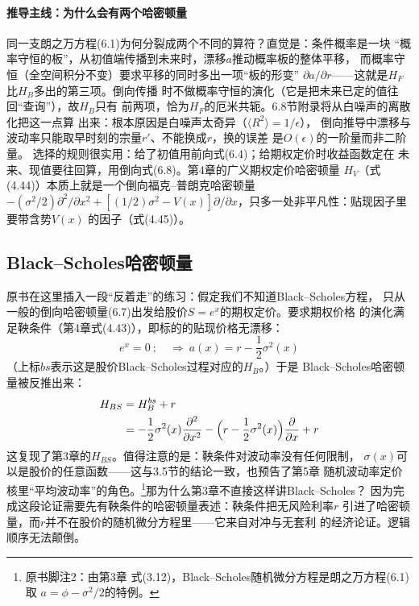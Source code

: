 \paragraph{推导主线：为什么会有两个哈密顿量}
同一支朗之万方程(6.1)为何分裂成两个不同的算符？直觉是：条件概率是一块
“概率守恒的板”，从初值端传播到未来时，漂移$a$推动概率板的整体平移，
而概率守恒（全空间积分不变）要求平移的同时多出一项“板的形变”
$\partial a/\partial r$——这就是$H_F$比$H_B$多出的第三项。倒向传播
时不做概率守恒的演化（它是把未来已定的值往回“查询”），故$H_B$只有
前两项，恰为$H_F$的厄米共轭。6.8节附录将从白噪声的离散化把这一点算
出来：根本原因是白噪声太奇异（$\langle R^2\rangle=1/\epsilon$），
倒向推导中漂移与波动率只能取早时刻的宗量$r'$、不能换成$r$，换的误差
是$O(\epsilon)$的一阶量而非二阶量。
选择的规则很实用：给了初值用前向式(6.4)；给期权定价时收益函数定在
未来、现值要往回算，用倒向式(6.8)。第4章的广义期权定价哈密顿量
$H_V$（式(4.44)）本质上就是一个倒向福克--普朗克哈密顿量
$-(\sigma^2/2)\partial^2/\partial x^2+[(1/2)\sigma^2-V(x)]
\partial/\partial x$，只多一处非平凡性：贴现因子里要带含势$V(x)$
的因子（式(4.45)）。

\subsection*{Black--Scholes哈密顿量}

原书在这里插入一段“反着走”的练习：假定我们不知道Black--Scholes方程，
只从一般的倒向哈密顿量(6.7)出发给股价$S=e^x$的期权定价。要求期权价格
的演化满足鞅条件（第4章式(4.43)），即标的的贴现价格无漂移：
\begin{equation*}
[H_B^{bs}+r]e^x=0\ ;\quad\Rightarrow\ a(x)=r-\frac{1}{2}\sigma^2(x)
\end{equation*}
（上标$bs$表示这是股价Black--Scholes过程对应的$H_B$。）于是
Black--Scholes哈密顿量被反推出来：
\begin{align*}
H_{BS}&=H_B^{bs}+r\\
&=-\frac{1}{2}\sigma^2(x)\frac{\partial^2}{\partial x^2}
-\Bigl(r-\frac{1}{2}\sigma^2(x)\Bigr)\frac{\partial}{\partial x}+r
\end{align*}
这复现了第3章的$H_{BS}$。值得注意的是：鞅条件对波动率没有任何限制，
$\sigma(x)$可以是股价的任意函数——这与3.5节的结论一致，也预告了第5章
随机波动率定价核里“平均波动率”的角色。\footnote{原书脚注2：由第3章
式(3.12)，Black--Scholes随机微分方程是朗之万方程(6.1)取
$a=\phi-\sigma^2/2$的特例。}那为什么第3章不直接这样讲Black--Scholes？
因为完成这段论证需要先有鞅条件的哈密顿量表述：鞅条件把无风险利率$r$
引进了哈密顿量，而$r$并不在股价的随机微分方程里——它来自对冲与无套利
的经济论证。逻辑顺序无法颠倒。

